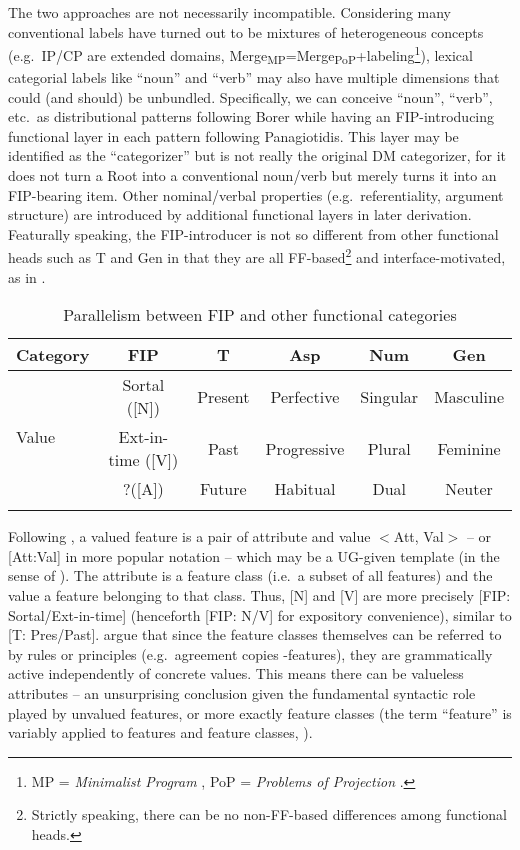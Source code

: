 \documentclass[output=paper]{langsci/langscibook}
\begin{document}
The two approaches are not necessarily incompatible. Considering many
conventional labels have turned out to be mixtures of heterogeneous concepts
(e.g.\ IP/CP are extended domains,
Merge\textsubscript{MP}=Merge\textsubscript{PoP}+labeling\footnote{\gls{MP} =
    {\em Minimalist Program} \citep{Chomsky1995}, PoP = {\em Problems of
Projection} \citep{Chomsky2013}.}), lexical categorial labels like ``noun'' and
``verb'' may also have multiple dimensions that could (and should) be
unbundled.  Specifically, we can conceive ``noun'', ``verb'', etc.\ as
distributional patterns following Borer while having an FIP-introducing
functional layer in each pattern following Panagiotidis. This layer may be
identified as the ``categorizer'' but is not really the original \gls{DM}
categorizer, for it does not turn a Root into a conventional noun/verb but
merely turns it into an FIP-bearing item. Other nominal/verbal properties
(e.g.\ referentiality, argument structure) are introduced by additional
functional layers in later derivation. Featurally speaking, the FIP-introducer
is not so different from other functional heads such as T and Gen in that they
are all FF-based\footnote{Strictly speaking, there can be no non-FF-based
    differences among functional heads.} and interface-motivated, as in
    .

\begin{table}[htp!]
\caption{Parallelism between \gls{FIP} and other functional categories}
\label{tab:1:parallelism}
 \begin{tabular}{lccccc}
  \lsptoprule
   Category         & \gls{FIP} & T & Asp & Num & Gen\\
  \midrule
  \multirow{3}{.1\textwidth}{Value}  &  Sortal ([N])  &    Present  &    Perfective     &Singular& Masculine\\
   &   Ext-in-time ([V]) &   Past &    Progressive    &Plural& Feminine\\
   & ?([A]) & Future & Habitual & Dual&Neuter \\
  \lspbottomrule
 \end{tabular}
\end{table}

Following \citet{AdgerSvenonius2011}, a valued feature is a pair of attribute
and value $<$Att, Val$>$ -- or [Att:Val] in more popular notation -- which may
be a UG-given template (in the sense of \citealt{Biberauer2016}). The attribute
is a feature class (i.e.\ a subset of all features) and the value a feature
belonging to that class. Thus, [N] and [V] are more precisely [FIP:
Sortal/Ext-in-time] (henceforth [FIP: N/V] for expository convenience), similar
to [T: Pres/Past]. \citeauthor{AdgerSvenonius2011} argue that since the feature
classes themselves can be referred to by rules or principles (e.g.\ agreement
copies {\textphi}-features), they are grammatically active independently of
concrete values. This means there can be valueless attributes -- an
unsurprising conclusion given the fundamental syntactic role played by unvalued
features, or more exactly feature classes (the term ``feature'' is variably
applied to features and feature classes, \citealt[35]{AdgerSvenonius2011}).
\end{document}
